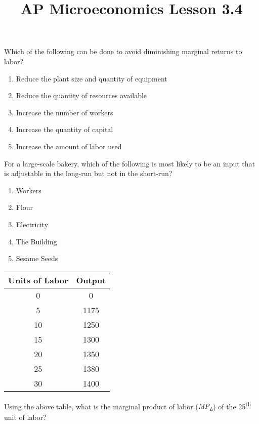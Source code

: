 \documentclass[12pt]{article}
\title{AP Microeconomics Lesson 3.4}
\begin{document}
\begin{flushleft}
 Which of the following can be done to avoid diminishing marginal returns to labor?
 \end{flushleft}

\begin{enumerate}[label = \alph*)]
	\item Reduce the plant size and quantity of equipment
	\item Reduce the quantity of resources available
	\item Increase the number of workers
	\item Increase the quantity of capital
	\item Increase the amount of labor used
\end{enumerate}


\begin{flushleft}
For a large-scale bakery, which of the following is most likely to be an input that is adjustable in the long-run but not in the short-run?
\end{flushleft}

\begin{enumerate}[label = (\alph*)]
	\item Workers
	\item Flour
	\item Electricity
	\item The Building
	\item Sesame Seeds
\end{enumerate}


\begin{center}
\vspace{1cm}
\begin{tabular}{ |c|c| }
	\hline
	\textbf{Units of Labor} & \textbf{Output} \\
	\hline
	0 & 0 \\
	5 & 1175 \\
	10 & 1250 \\
	15 & 1300 \\
	20 & 1350 \\
	25 & 1380 \\
	30 & 1400 \\
	\hline
\end{tabular}
\end{center}

\begin{flushleft}
Using the above table, what is the marginal product of labor (\emph{MP\textsubscript{L}}) of the 25\textsuperscript{th} unit of labor?\end{flushleft}
\end{document}

